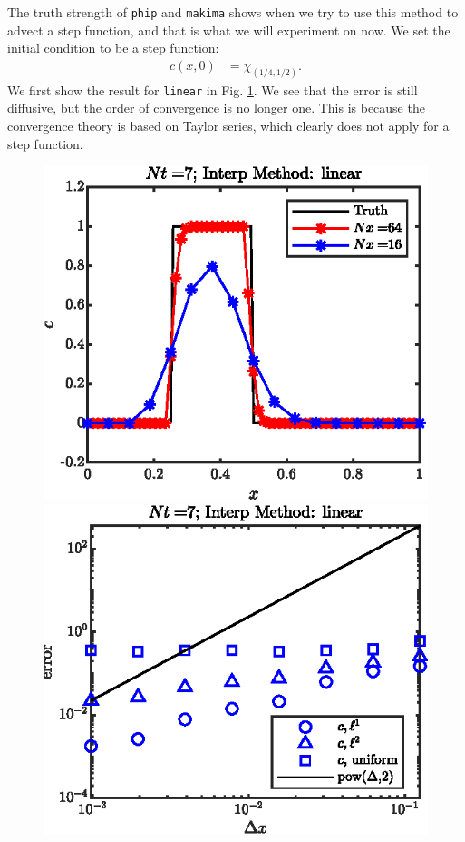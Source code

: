 \documentclass[11pt,letterpaper]{article}
\begin{document}
The truth strength of \texttt{phip} and \texttt{makima} shows when we try to use this method to advect a step function, and that is what we will experiment on now. We set the initial condition to be a step function:
\begin{align*}
    c(x,0) &= \chi_{(1/4,1/2)}.
\end{align*}
We first show the result for \texttt{linear} in Fig. \ref{fig:1D_step_cons_linear_}. We see that the error is still diffusive, but the order of convergence is no longer one. This is because the convergence theory is based on Taylor series, which clearly does not apply for a step function.
\begin{figure}[H]
    \centering
    \includegraphics{figs/1D_step_cons_linear_sol}
    \includegraphics{figs/1D_step_cons_linear_convord}
    \caption{}\label{fig:1D_step_cons_linear_}
\end{figure}
\end{document}
